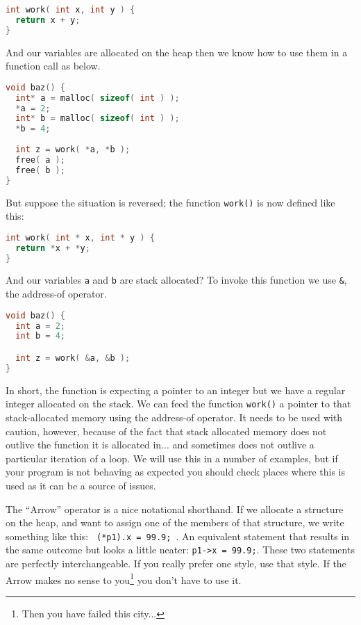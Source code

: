 \begin{lstlisting}[language=C]
int work( int x, int y ) {
  return x + y;
}
\end{lstlisting}

And our variables are allocated on the heap then we know how to use them in a function call as below.

\begin{lstlisting}[language=C]
void baz() {
  int* a = malloc( sizeof( int ) );
  *a = 2;
  int* b = malloc( sizeof( int ) );
  *b = 4;
  
  int z = work( *a, *b );
  free( a );
  free( b );
}
\end{lstlisting}

But suppose the situation is reversed; the function \texttt{work()} is now defined like this:

\begin{lstlisting}[language=C]
int work( int * x, int * y ) {
  return *x + *y;
}
\end{lstlisting}

And our variables \texttt{a} and \texttt{b} are stack allocated? To invoke this function we use \texttt{\&}, the address-of operator.

\begin{lstlisting}[language=C]
void baz() {
  int a = 2;
  int b = 4;

  int z = work( &a, &b );
}
\end{lstlisting}

In short, the function is expecting a pointer to an integer but we have a regular integer allocated on the stack. We can feed the function \texttt{work()} a pointer to that stack-allocated memory using the address-of operator. It needs to be used with caution, however, because of the fact that stack allocated memory does not outlive the function it is allocated in... and sometimes does not outlive a particular iteration of a loop. We will use this in a number of examples, but if your program is not behaving as expected you should check places where this is used as it can be a source of issues.

The ``Arrow'' operator is a nice notational shorthand. If we allocate a structure on the heap, and want to assign one of the members of that structure, we write something like this: \texttt{ (*p1).x = 99.9; }. An equivalent statement that results in the same outcome but looks a little neater: \texttt{p1->x = 99.9;}. These two statements are perfectly interchangeable. If you really prefer one style, use that style. If the Arrow makes no sense to you\footnote{Then you have failed this city...} you don't have to use it.

